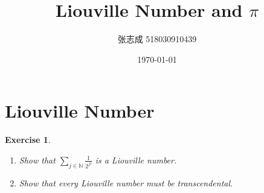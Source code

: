 \documentclass[UTF8, 12pt]{ctexart}
\title{Liouville Number and $\pi$}
\author{张志成 518030910439}
\date{\today}
\newtheorem*{exercise*}{Exercise}
\begin{document}
    \maketitle
    \section{Liouville Number}
    \begin{exercise*} 
        \begin{enumerate}[label=\arabic*)]
            \item Show that $\sum_{j\in\mathbb{N}}\frac{1}{2^{j!}}$ is a Liouville number.
            \item Show that every Liouville number must be transcendental.
        \end{enumerate}
    \end{exercise*}
\end{document}
